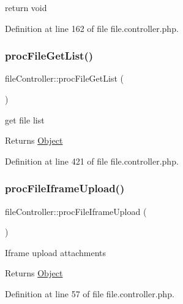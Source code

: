 \begin{DoxyPre}return void
\end{DoxyPre}


Definition at line 162 of file file.\+controller.\+php.

\hypertarget{classfileController_ad1cdb6696de4e0c90532412bb80a359e}{}\label{classfileController_ad1cdb6696de4e0c90532412bb80a359e} 
\subsubsection{\texorpdfstring{proc\+File\+Get\+List()}{procFileGetList()}}
{\footnotesize\ttfamily file\+Controller\+::proc\+File\+Get\+List (\begin{DoxyParamCaption}{ }\end{DoxyParamCaption})}

get file list

\begin{DoxyReturn}{Returns}
\hyperlink{classObject}{Object} 
\end{DoxyReturn}


Definition at line 421 of file file.\+controller.\+php.

\hypertarget{classfileController_a423c909fc5841f83d9a965839180aad5}{}\label{classfileController_a423c909fc5841f83d9a965839180aad5} 
\subsubsection{\texorpdfstring{proc\+File\+Iframe\+Upload()}{procFileIframeUpload()}}
{\footnotesize\ttfamily file\+Controller\+::proc\+File\+Iframe\+Upload (\begin{DoxyParamCaption}{ }\end{DoxyParamCaption})}

Iframe upload attachments

\begin{DoxyReturn}{Returns}
\hyperlink{classObject}{Object} 
\end{DoxyReturn}


Definition at line 57 of file file.\+controller.\+php.

\hypertarget{classfileController_a29e461f3cb7a84ddbb07b0abcdeef2e5}{}\label{classfileController_a29e461f3cb7a84ddbb07b0abcdeef2e5} 
